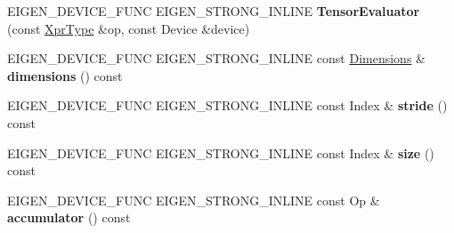 \begin{DoxyCompactItemize}
E\+I\+G\+E\+N\+\_\+\+D\+E\+V\+I\+C\+E\+\_\+\+F\+U\+NC E\+I\+G\+E\+N\+\_\+\+S\+T\+R\+O\+N\+G\+\_\+\+I\+N\+L\+I\+NE {\bfseries Tensor\+Evaluator} (const \hyperlink{class_eigen_1_1_tensor_scan_op}{Xpr\+Type} \&op, const Device \&device)
\item 
\mbox{\label{struct_eigen_1_1_tensor_evaluator_3_01const_01_tensor_scan_op_3_01_op_00_01_arg_type_01_4_00_01_device_01_4_a2c8e67b83117c15c8cd436e8b0ac6488}} 
E\+I\+G\+E\+N\+\_\+\+D\+E\+V\+I\+C\+E\+\_\+\+F\+U\+NC E\+I\+G\+E\+N\+\_\+\+S\+T\+R\+O\+N\+G\+\_\+\+I\+N\+L\+I\+NE const \hyperlink{struct_eigen_1_1_d_sizes}{Dimensions} \& {\bfseries dimensions} () const
\item 
\mbox{\label{struct_eigen_1_1_tensor_evaluator_3_01const_01_tensor_scan_op_3_01_op_00_01_arg_type_01_4_00_01_device_01_4_aad8a85e2ceb4bf7de446bdd4ff39ce1e}} 
E\+I\+G\+E\+N\+\_\+\+D\+E\+V\+I\+C\+E\+\_\+\+F\+U\+NC E\+I\+G\+E\+N\+\_\+\+S\+T\+R\+O\+N\+G\+\_\+\+I\+N\+L\+I\+NE const Index \& {\bfseries stride} () const
\item 
\mbox{\label{struct_eigen_1_1_tensor_evaluator_3_01const_01_tensor_scan_op_3_01_op_00_01_arg_type_01_4_00_01_device_01_4_a1f77913e3f7a993e930a20e045319342}} 
E\+I\+G\+E\+N\+\_\+\+D\+E\+V\+I\+C\+E\+\_\+\+F\+U\+NC E\+I\+G\+E\+N\+\_\+\+S\+T\+R\+O\+N\+G\+\_\+\+I\+N\+L\+I\+NE const Index \& {\bfseries size} () const
\item 
\mbox{\label{struct_eigen_1_1_tensor_evaluator_3_01const_01_tensor_scan_op_3_01_op_00_01_arg_type_01_4_00_01_device_01_4_afc6b1a085bb45c4218227c2ecb42d1d5}} 
E\+I\+G\+E\+N\+\_\+\+D\+E\+V\+I\+C\+E\+\_\+\+F\+U\+NC E\+I\+G\+E\+N\+\_\+\+S\+T\+R\+O\+N\+G\+\_\+\+I\+N\+L\+I\+NE const Op \& {\bfseries accumulator} () const
\item 
\mbox{\label{struct_eigen_1_1_tensor_evaluator_3_01const_01_tensor_scan_op_3_01_op_00_01_arg_type_01_4_00_01_device_01_4_a311f52464d604f18f51fda8e481e3b0f}} 

\end{DoxyCompactItemize}
